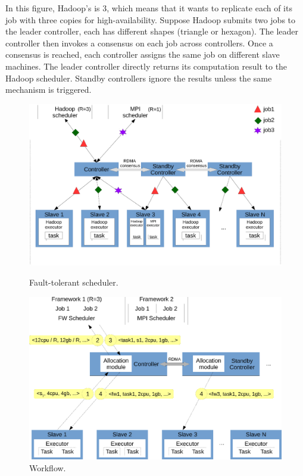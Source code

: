 In this figure, Hadoop's  is 3, which means that it wants to replicate 
each of its job with three copies for high-availability. Suppose Hadoop 
submits two jobs to the leader controller, each has different shapes (triangle 
or hexagon). The leader controller then invokes a consensus on each job across 
controllers. Once a consensus is reached, each controller assigns the same job 
on different slave machines. The leader controller directly returns its 
computation result to the Hadoop scheduler. Standby controllers ignore the 
results unless the same mechanism is triggered.

\begin{figure}[!htb]
    \begin{minipage}{.49\textwidth}
        \vspace{-.2in}
        \includegraphics[width=0.34\textheight]{figures/scheduler_arch.eps}
        \vspace{-.3in}
        \caption{Fault-tolerant scheduler.}
        \label{fig:scheduler-arch}
    \end{minipage}
    \begin{minipage}{0.51\textwidth}
        \vspace{-.2in}
        \includegraphics[width=0.34\textheight]{figures/scheduler_flow.eps}
        \vspace{-.3in}
        \caption{Workflow.}
        \label{fig:scheduler-workflow}
    \end{minipage}
\end{figure}

